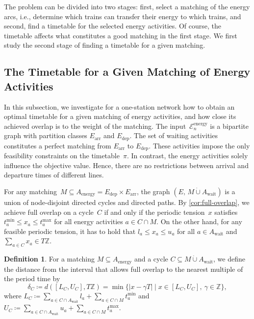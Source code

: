 \documentclass[11pt,a4paper]{article}
\newcommand{\dotcup}{\mathbin{\dot\cup}}
\newcommand{\arr}{\mathrm{arr}}
\newcommand{\dep}{\mathrm{dep}}
\newcommand{\wait}{\mathrm{wait}}
\newcommand{\energy}{\mathrm{energy}}
\newcommand{\energyact}{M}               %
\newcommand{\possenergyact}{A_{\energy}} %
\newcommand{\osn}{one-station network\xspace}
\newcommand{\Z}{\mathbb Z}
\newcommand{\cE}{\mathcal{E}}
\theoremstyle{definition}
\newtheorem{definition}[theorem]{Definition}
\theoremstyle{remark}
\begin{document}
The problem can be divided into two stages: first, select a matching of the energy arcs, i.e., determine which trains can transfer their energy to which trains, and second, find a timetable for the selected energy activities. Of course, the timetable affects what constitutes a good matching in the first stage. We first study the second stage of finding a timetable for a given matching.


\subsection{The Timetable for a Given Matching of Energy Activities}

In this subsection, we investigate for a \osn how to obtain an optimal timetable for a given matching of energy activities, and how close its achieved overlap is to the weight of the matching.
The input~$\cE_n^{\energy}$ is a bipartite graph with partition classes $E_\arr$ and $E_\dep$. The set of waiting activities constitutes a perfect matching from $E_\arr$ to $E_\dep$. These activities impose the only feasibility constraints on the timetable~$\pi$. In contrast, the energy activities solely influence the objective value. Hence, there are no restrictions between arrival and departure times of different lines.

For any matching~$\energyact \subseteq \possenergyact = E_\dep \times E_\arr$, the graph $(E,\,\energyact \dotcup A_\wait)$ is a union of node-disjoint directed cycles and directed paths. By \cref{cor:full-overlap}, we achieve full overlap on a cycle~$C$ if and only if the periodic tension~$x$ satisfies $t_{a}^{\min} \le x_a \le t_a^{\max}$ for all energy activities $a \in C \cap \energyact$. On the other hand, for any feasible periodic tension, it has to hold that $l_a \le x_a \le u_a$ for all $a \in A_{\wait}$ and $\sum_{a \in C} x_a \in T \Z$.



\begin{definition}
    \label{def:delta}
    For a matching $\energyact \subseteq \possenergyact$ and a cycle $C \subseteq \energyact \dotcup A_\wait$, we define the distance from the interval that allows full overlap to the nearest multiple of the period time by
	\[ \delta_C \coloneqq d([L_C, U_C], T\Z) = \min \{|x - \gamma T| \mid x \in [L_C, U_C],\ \gamma \in \Z\},
    \]
    where $L_C \coloneqq \sum_{a \in C \cap A_{\wait}} l_a + \sum_{a \in C \cap \energyact} t_a^{\min}$ and $U_C \coloneqq \sum_{a \in C \cap A_{\wait}} u_a + \sum_{a \in C \cap \energyact} t_a^{\max}$.
\end{definition}
\end{document}

